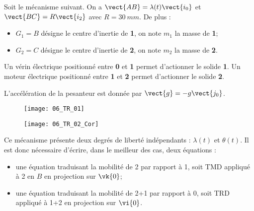 \normaltrue
\correctiontrue


\setcounter{question}{0}%
\ifcorrection
\else
{}
\fi

\ifprof
\else
Soit le mécanisme suivant. On a $\vect{AB}=\lambda(t)\vect{i_0}$ et $\vect{BC}=R\vect{i_2}$ avec $R=\SI{30}{mm}$.
De plus :
\begin{itemize}
\item $G_1=B$ désigne le centre d'inertie de \textbf{1}, on note $m_1$ la masse de \textbf{1};%
\item $G_2=C$ désigne le centre d'inertie de \textbf{2}, on note $m_2$ la masse de \textbf{2}.%
\end{itemize}

Un vérin électrique positionné entre \textbf{0} et \textbf{1}  permet d'actionner le solide \textbf{1}.
Un moteur électrique positionné entre \textbf{1} et \textbf{2}  permet d'actionner le solide \textbf{2}.

L'accélération de la pesanteur est donnée par $\vect{g}=-g\vect{j_0}$.

\begin{figure}[!h]
\centering
\texttt{[image: 06\_TR\_01]}
\end{figure}
\fi

\ifprof
\begin{figure}[!h]
\texttt{[image: 06\_TR\_02\_Cor]}
\end{figure}
\else
\fi

\ifprof
Ce mécanisme présente deux degrés de liberté indépendants : $\lambda(t)$ et $\theta(t)$. Il est donc nécessaire d'écrire, dans le meilleur des cas, deux équations :
\begin{itemize}
\item une équation traduisant la mobilité de 2 par rapport à 1, soit TMD appliqué à 2 en $B$ en projection sur $\vk{0}$;
\item une équation traduisant la mobilité de 2+1 par rapport à 0, soit TRD appliqué à 1+2 en projection sur $\vi{0}$.
\end{itemize}

